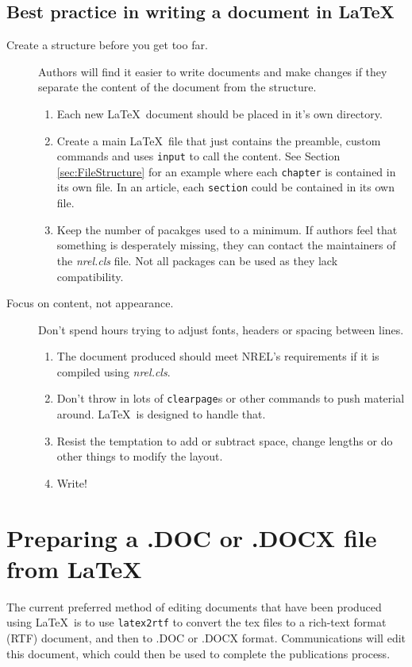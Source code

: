 \documentclass[12pt,letterpaper]{report}
\begin{document}
\section{Best practice in writing a document in \LaTeX}
\begin{description}
\item[Create a structure before you get too far.] Authors will find it easier to write documents and make changes if they separate the content of the document from the structure.
\begin{enumerate}
\item Each new \LaTeX\ document should be placed in it's own directory. 
\item Create a main \LaTeX\ file that just contains the preamble, custom commands and uses \texttt{input} to call the content. See Section \ref{sec:FileStructure} for an example where each \texttt{chapter} is contained in its own file. In an article, each \texttt{section} could be contained in its own file.
\item Keep the number of pacakges used to a minimum. If authors feel that something is desperately missing, they can contact the maintainers of the \emph{nrel.cls} file. Not all packages can be used as they lack compatibility.
\end{enumerate}
\item[Focus on content, not appearance.] Don't spend hours trying to adjust fonts, headers or spacing between lines. 
\begin{enumerate}
\item The document produced should meet NREL's requirements if it is compiled using \emph{nrel.cls}. 
\item Don't throw in lots of \texttt{clearpage}s or other commands to push material around. \LaTeX\ is designed to handle that. 
\item Resist the temptation to add or subtract space, change lengths or do other things to modify the layout. 
\item Write!
\end{enumerate}
\end{description}

\chapter{Preparing a .DOC or .DOCX file from \LaTeX \label{sec:latextortf}}
The current preferred method of editing documents that have been produced using \LaTeX\ is to use \texttt{latex2rtf} to convert the tex files to a rich-text format (RTF) document, and then to .DOC or .DOCX format. Communications will edit this document, which could then be used to complete the publications process.
\end{document}
